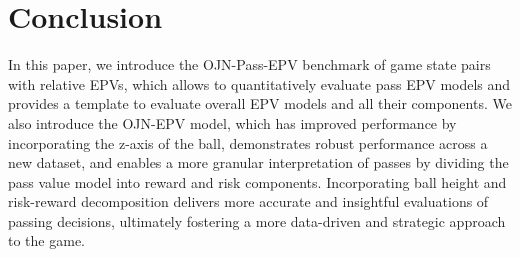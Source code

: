 \section{Conclusion}
In this paper, we introduce the OJN-Pass-EPV benchmark of game state pairs with relative EPVs, which allows to quantitatively evaluate pass EPV models and provides a template to evaluate overall EPV models and all their components. We also introduce the OJN-EPV model, which has improved performance by incorporating the z-axis of the ball, demonstrates robust performance across a new dataset, and enables a more granular interpretation of passes by dividing the pass value model into reward and risk components. Incorporating ball height and risk-reward decomposition delivers more accurate and insightful evaluations of passing decisions, ultimately fostering a more data-driven and strategic approach to the game.